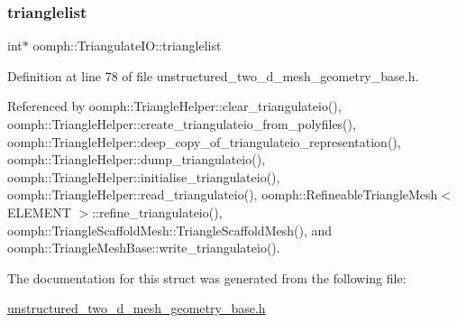 \mbox{\label{structoomph_1_1TriangulateIO_a53c9e2c787d52b89c8c9434e3983a57b}} 
\subsubsection{\texorpdfstring{trianglelist}{trianglelist}}
{\footnotesize\ttfamily int$\ast$ oomph\+::\+Triangulate\+I\+O\+::trianglelist}



Definition at line 78 of file unstructured\+\_\+two\+\_\+d\+\_\+mesh\+\_\+geometry\+\_\+base.\+h.



Referenced by oomph\+::\+Triangle\+Helper\+::clear\+\_\+triangulateio(), oomph\+::\+Triangle\+Helper\+::create\+\_\+triangulateio\+\_\+from\+\_\+polyfiles(), oomph\+::\+Triangle\+Helper\+::deep\+\_\+copy\+\_\+of\+\_\+triangulateio\+\_\+representation(), oomph\+::\+Triangle\+Helper\+::dump\+\_\+triangulateio(), oomph\+::\+Triangle\+Helper\+::initialise\+\_\+triangulateio(), oomph\+::\+Triangle\+Helper\+::read\+\_\+triangulateio(), oomph\+::\+Refineable\+Triangle\+Mesh$<$ E\+L\+E\+M\+E\+N\+T $>$\+::refine\+\_\+triangulateio(), oomph\+::\+Triangle\+Scaffold\+Mesh\+::\+Triangle\+Scaffold\+Mesh(), and oomph\+::\+Triangle\+Mesh\+Base\+::write\+\_\+triangulateio().



The documentation for this struct was generated from the following file\+:\begin{DoxyCompactItemize}
\item 
\hyperlink{unstructured__two__d__mesh__geometry__base_8h}{unstructured\+\_\+two\+\_\+d\+\_\+mesh\+\_\+geometry\+\_\+base.\+h}\end{DoxyCompactItemize}
